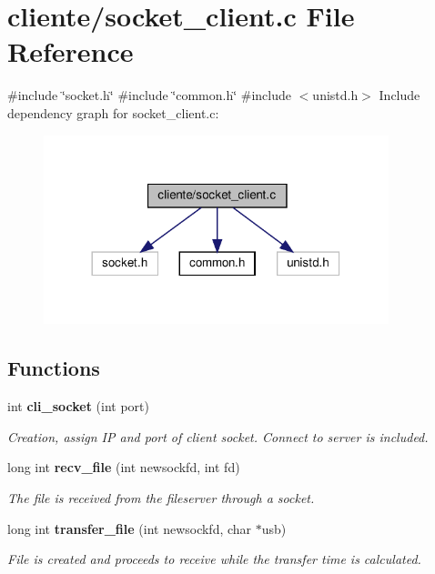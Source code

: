 \section{cliente/socket\+\_\+client.c File Reference}
\label{socket__client_8c}
{\ttfamily \#include \char`\"{}socket.\+h\char`\"{}}\newline
{\ttfamily \#include \char`\"{}common.\+h\char`\"{}}\newline
{\ttfamily \#include $<$unistd.\+h$>$}\newline
Include dependency graph for socket\+\_\+client.\+c\+:
\nopagebreak
\begin{figure}[H]
\begin{center}
\leavevmode
\includegraphics[width=284pt]{socket__client_8c__incl}
\end{center}
\end{figure}
\subsection*{Functions}
\begin{DoxyCompactItemize}
\item 
int \textbf{ cli\+\_\+socket} (int port)
\begin{DoxyCompactList}\small\item\em Creation, assign IP and port of client socket. Connect to server is included. \end{DoxyCompactList}\item 
long int \textbf{ recv\+\_\+file} (int newsockfd, int fd)
\begin{DoxyCompactList}\small\item\em The file is received from the fileserver through a socket. \end{DoxyCompactList}\item 
long int \textbf{ transfer\+\_\+file} (int newsockfd, char $\ast$usb)
\begin{DoxyCompactList}\small\item\em File is created and proceeds to receive while the transfer time is calculated. \end{DoxyCompactList}\end{DoxyCompactItemize}


